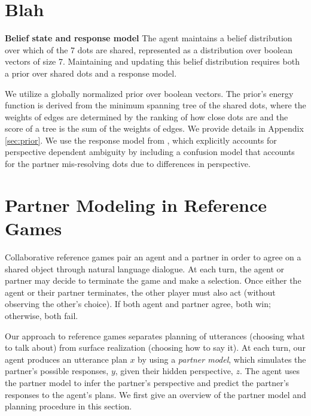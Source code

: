\documentclass[11pt]{article}
\begin{document}

\section{Blah}
\textbf{Belief state and response model}
The agent maintains a belief distribution over which of the 7
dots are shared, represented as a distribution over boolean vectors of size 7.
Maintaining and updating this belief distribution requires both a prior over shared dots
and a response model.

We utilize a globally normalized prior over boolean vectors.
The prior's energy function is derived from the minimum spanning tree of the shared dots, where the weights of edges are determined by the ranking of how close dots are and the score of a tree is the sum of the weights of edges.
We provide details in Appendix \ref{sec:prior}.
We use the response model from \citep{ocp}, which explicitly accounts for perspective dependent ambiguity
by including a confusion model that accounts for the partner mis-resolving dots due to differences in perspective.


\section{Partner Modeling in Reference Games}
\label{sec:planning}

Collaborative reference games pair an agent and a partner in order to agree on a shared object through natural language dialogue.
At each turn, the agent or partner may decide to terminate the game and make a selection.
Once either the agent or their partner terminates, the other player must also act (without observing the other's choice). If both agent and partner agree, both win; otherwise, both fail. 

Our approach to reference games separates planning of utterances (choosing what to talk about) from surface realization (choosing how to say it).
At each turn, our agent produces an utterance plan $x$ by using a \emph{partner model}, which simulates the partner's possible responses, $y$, given their hidden perspective, $z$.
The agent uses the partner model to infer the partner's perspective and predict the partner's responses to the agent's plans.
We first give an overview of the partner model 
and planning procedure in this section.
\end{document}
